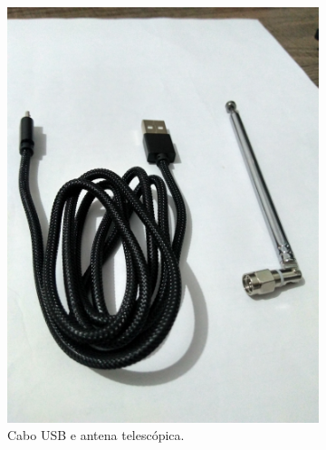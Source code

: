 \documentclass[
  12pt,				%
  openright,			%
  twoside,			%
  a4paper,			%
  english,			%
  french,				%
  spanish,			%
  brazil,				%
  ]{abntex2}
\begin{document}
\newpage
\begin{figure}[!htb]
  \centering
  \begin{subfigure}[b]{0.45\linewidth}
    \centering
    \includegraphics[width=\linewidth]{figures/hackrf/hack_rf_cabo_usb_antena_linear.jpg}
    \caption{Cabo USB e antena telescópica.}
    \label{fig:hack_rf_cabo_usb_antena_linear}
  \end{subfigure}
  \hspace{0.5cm}
  \begin{subfigure}[b]{0.45\linewidth}
    \centering

\end{subfigure}
\end{figure}
\end{document}
